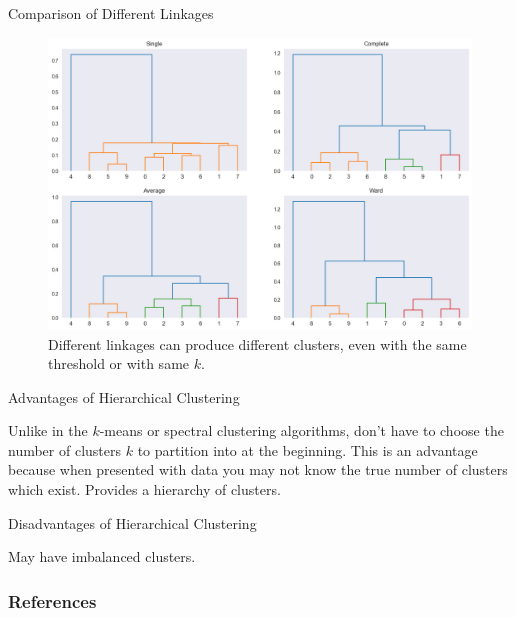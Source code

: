 \documentclass{beamer}
\begin{document}
\begin{frame}{Comparison of Different Linkages}
    \begin{figure}
        \centering
        \includegraphics[scale=0.3]{different_linkages.png}
        \caption{Different linkages can produce different clusters, even with the same threshold or with same $k$.}
        \label{fig:enter-label}
    \end{figure}
\end{frame}
   
    


    

\begin{frame}{Advantages of Hierarchical Clustering}
    \begin{outline}
        \1 Unlike in the $k$-means or spectral clustering algorithms, don't have to choose the number of clusters $k$ to partition into at the beginning. This is an advantage because when presented with data you may not know the true number of clusters which exist.
        \1 Provides a hierarchy of clusters.
    \end{outline}
\end{frame}

\begin{frame}{Disadvantages of Hierarchical Clustering}
    \begin{outline}
        \1 May have imbalanced clusters.
    \end{outline}
\end{frame}

\begin{frame}
\frametitle{References}


\nocite{*}
\end{frame}
\end{document}
